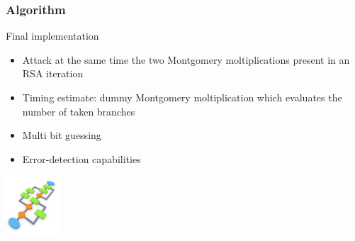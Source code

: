 \documentclass{beamer}
\begin{document}
\begin{frame}[fragile]
    \frametitle{Algorithm}
    \begin{block}{Final implementation}
        \begin{itemize}
            \pause \item Attack at the same time the two Montgomery moltiplications present in an RSA iteration
            \pause \item Timing estimate: dummy Montgomery moltiplication which evaluates the number of taken branches
            \pause \item Multi bit guessing
            \pause \item Error-detection capabilities
        \end{itemize}
    \end{block}
    \hfill \includegraphics[width=2cm]{./graphics/algorithm}
\end{frame}
\end{document}
